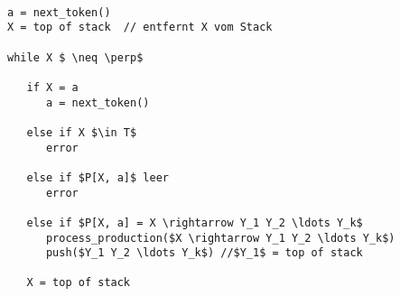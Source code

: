 \documentclass[
border=0.2cm,
convert={density=600}
]{standalone}
\begin{document}
	
	
	\begin{lstlisting}[mathescape,backgroundcolor=\color{lightgray},basicstyle=\scriptsize\ttfamily]

a = next_token()
X = top of stack  // entfernt X vom Stack
	
while X $ \neq \perp$

   if X = a
      a = next_token()  
         
   else if X $\in T$
      error
      
   else if $P[X, a]$ leer
      error
      
   else if $P[X, a] = X \rightarrow Y_1 Y_2 \ldots Y_k$
      process_production($X \rightarrow Y_1 Y_2 \ldots Y_k$)      
      push($Y_1 Y_2 \ldots Y_k$) //$Y_1$ = top of stack

   X = top of stack
\end{lstlisting}
\end{document}
